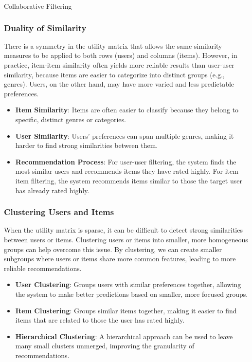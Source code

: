 \begin{notes}{Collaborative Filtering}
    \subsubsection*{Duality of Similarity}
    
    There is a symmetry in the utility matrix that allows the same similarity measures to be applied to both rows (users) and columns (items). However, in practice, item-item similarity often yields more reliable results 
    than user-user similarity, because items are easier to categorize into distinct groups (e.g., genres). Users, on the other hand, may have more varied and less predictable preferences.
    
    \begin{highlight}
        \begin{itemize}
            \item \textbf{Item Similarity}: Items are often easier to classify because they belong to specific, distinct genres or categories.
            \item \textbf{User Similarity}: Users' preferences can span multiple genres, making it harder to find strong similarities between them.
            \item \textbf{Recommendation Process}: For user-user filtering, the system finds the most similar users and recommends items they have rated highly. For item-item filtering, the system recommends items 
            similar to those the target user has already rated highly.
        \end{itemize}
    \end{highlight}
    
    \subsubsection*{Clustering Users and Items}
    
    When the utility matrix is sparse, it can be difficult to detect strong similarities between users or items. Clustering users or items into smaller, more homogeneous groups can help overcome this issue. By clustering, 
    we can create smaller subgroups where users or items share more common features, leading to more reliable recommendations.
    
    \begin{highlight}
        \begin{itemize}
            \item \textbf{User Clustering}: Groups users with similar preferences together, allowing the system to make better predictions based on smaller, more focused groups.
            \item \textbf{Item Clustering}: Groups similar items together, making it easier to find items that are related to those the user has rated highly.
            \item \textbf{Hierarchical Clustering}: A hierarchical approach can be used to leave many small clusters unmerged, improving the granularity of recommendations.
        \end{itemize}
    \end{highlight}
    

\end{notes}
